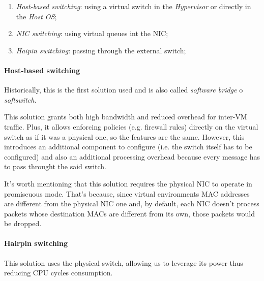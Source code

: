 \noindent
\begin{minipage}{0.48\textwidth}
\begin{enumerate}
    \item \emph{Host-based switching}: using a virtual switch in the
    \emph{Hypervisor} or directly in the \emph{Host OS};
    \item \emph{NIC switching}: using virtual queues int the NIC;
    \item \emph{Haipin switching}: passing through the external switch;
\end{enumerate}
\end{minipage}
\hfill
\begin{minipage}{0.48\textwidth}
    \centering
\end{minipage}

\paragraph{Host-based switching}
Historically, this is the first solution used and is also called \emph{software
bridge} o \emph{softswitch}.

\bigskip\noindent
\begin{minipage}{0.48\textwidth}
    This solution grants both high bandwidth and reduced overhead for inter-VM
    traffic. Plus, it allows enforcing policies (e.g. firewall rules) directly
    on the virtual switch as if it was a physical one, so the features are the
    same. However, this introduces an additional component to configure (i.e. the
    switch itself has to be configured) and also an additional processing
    overhead because every message has to pass throught the said switch.
\end{minipage}
\hfill
\begin{minipage}{0.48\textwidth}
    \centering
\end{minipage}

\bigskip\noindent
It's worth mentioning that this solution requires the physical NIC to operate in
promiscuous mode. That's because, since virtual environments MAC addresses are
different from the physical NIC one and, by default, each NIC doesn't process
packets whose destination MACs are different from its own, those packets would
be dropped.

\paragraph{Hairpin switching}
This solution uses the physical switch, allowing us to leverage its power thus
reducing CPU cycles consumption.

